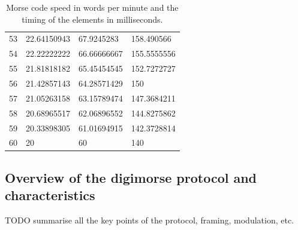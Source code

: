 \documentclass[a4paper]{tufte-handout}
\begin{document}
\begin{table}[!h]
\begin{tabular}{llll}
            53 & 22.64150943 & 67.9245283 & 158.490566 \\
            54 & 22.22222222 & 66.66666667 & 155.5555556 \\
            55 & 21.81818182 & 65.45454545 & 152.7272727 \\
            56 & 21.42857143 & 64.28571429 & 150 \\
            57 & 21.05263158 & 63.15789474 & 147.3684211 \\
            58 & 20.68965517 & 62.06896552 & 144.8275862 \\
            59 & 20.33898305 & 61.01694915 & 142.3728814 \\
            60 & 20 & 60 & 140 \\
            \bottomrule
        \end{tabular}
        \caption{Morse code speed in words per minute and the timing of the elements in milliseconds.}
        \label{tab:morsetab}
    \end{table}

\subsection{Overview of the digimorse protocol and characteristics}

TODO summarise all the key points of the protocol, framing, modulation, etc.

\pagebreak


\end{document}

